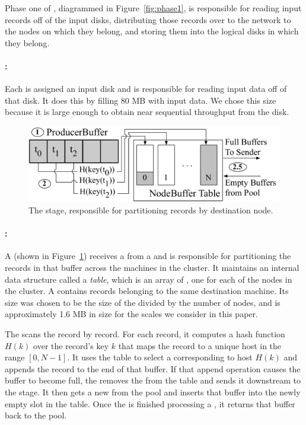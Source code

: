 Phase one of \tritonsort, diagrammed in Figure~\ref{fig:phase1}, is responsible
for reading input records off of the input disks, distributing those records over
to the network to the nodes on which they belong, and storing them into
the logical disks in which they belong.

\paragraph{\reader:} Each \reader is assigned an input disk and
is responsible for reading input data off of that disk.  It does this by
filling 80 MB \producerbuffers with input data.
We chose this size because it is large
enough to obtain near sequential throughput from the disk.

\begin{figure}
  \centering
  \includegraphics[width=\columnwidth]{tritonsort/figs/pnts_stage.pdf}
  \caption{The \pnts stage, responsible for partitioning records by
    destination node.}
  \label{fig:pnts}
\end{figure}

\paragraph{\pnts:} A \pnts (shown in Figure~\ref{fig:pnts}) receives a
\producerbuffer from a \reader and is responsible for partitioning the records
in that buffer across the machines in the cluster.  It maintains an internal
data structure called a \emph{\nodebuffer table}, which is an array of
\nodebuffers, one for each of the nodes in the cluster.  A \nodebuffer contains
records belonging to the same destination machine.  Its size was chosen to be
the size of the \producerbuffer divided by the number of nodes, and is
approximately 1.6 MB in size for the scales we consider in this paper.

The \pnts scans the \producerbuffer record by record.  For each record, it
computes a hash function $H(k)$ over the record's key $k$ that maps the record to
a unique host in the range $[0,N-1]$.  It uses the \nodebuffer table to select
a \nodebuffer corresponding to host $H(k)$ and appends the record to the end of
that buffer.  If that append operation causes the buffer to become full, the
\pnts removes the \nodebuffer from the \nodebuffer table and sends it
downstream to the \sender stage.  It then gets a new \nodebuffer from the
\nodebuffer pool and inserts that buffer into the newly empty slot in the
\nodebuffer table.  Once the \pnts is finished processing a
\producerbuffer, it returns that buffer back to the \producerbuffer pool.

